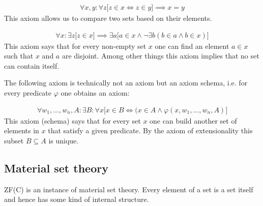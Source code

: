     \begin{axiom}[Extensionality]
        \begin{gather}
            \forall x, y:\forall z\big[z\in x \iff z\in y\big]\implies x=y
        \end{gather}
        This axiom allows us to compare two sets based on their elements.
    \end{axiom}

    \begin{axiom}
        \begin{gather}
            \forall x:\exists z\big[z\in x\big]\implies \exists a\big[a\in x \land \neg\exists b(b\in a \land b\in x)\big]
        \end{gather}
        This axiom says that for every non-empty set $x$ one can find an element $a\in x$ such that $x$ and $a$ are disjoint. Among other things this axiom implies that no set can contain itself.
    \end{axiom}

    The following axiom is technically not an axiom but an axiom schema, i.e. for every predicate $\varphi$ one obtains an axiom:
    \begin{axiom}[Specification]
        \begin{gather}
            \forall w_1,\ldots,w_n, A:\exists B:\forall x\big[x\in B\iff(x\in A\land \varphi(x, w_1,\ldots,w_n,A)\big]
        \end{gather}
        This axiom (schema) says that for every set $x$ one can build another set of elements in $x$ that satisfy a given predicate. By the axiom of extensionality this subset $B\subseteq A$ is unique.
    \end{axiom}

\subsection{Material set theory}

    ZF(C) is an instance of material set theory. Every element of a set is a set itself and hence has some kind of internal structure.


